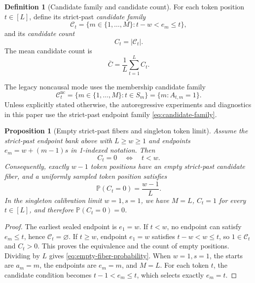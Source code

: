 \documentclass{article}
\theoremstyle{plain}
\newtheorem{proposition}[theorem]{Proposition}
\theoremstyle{definition}
\newtheorem{definition}[theorem]{Definition}
\theoremstyle{remark}
\begin{document}
\begin{definition}[Candidate family and candidate count]
\label{def:candidate-family}
For each token position $t\in [L]$, define its strict-past \emph{candidate family}
\begin{equation}
\label{eq:candidate-family}
\mathcal C_t=\{m\in\{1,\dots,M\}: t-w<e_m\le t\},
\end{equation}
and its \emph{candidate count}
\begin{equation}
\label{eq:candidate-count}
C_t=|\mathcal C_t|.
\end{equation}
The mean candidate count is
\begin{equation}
\label{eq:mean-candidate-count}
\bar C=\frac{1}{L}\sum_{t=1}^L C_t.
\end{equation}
\end{definition}

The legacy noncausal mode uses the membership candidate family
\begin{equation}
\label{eq:noncausal-candidate-family}
\mathcal C_t^{\mathrm{nc}}=\{m\in\{1,\dots,M\}:t\in S_m\}=\{m:A_{t,m}=1\}.
\end{equation}
Unless explicitly stated otherwise, the autoregressive experiments and diagnostics in this paper use the strict-past endpoint family \eqref{eq:candidate-family}.

\begin{proposition}[Empty strict-past fibers and singleton token limit]
\label{prop:legacy-empty-strict-past-fibers}
Assume the strict-past endpoint bank above with $L\ge w\ge1$ and endpoints
$e_m=w+(m-1)s$ in 1-indexed notation. Then
\[
C_t=0 \quad\Longleftrightarrow\quad t< w .
\]
Consequently, exactly $w-1$ token positions have an empty strict-past
candidate fiber, and a uniformly sampled token position satisfies
\begin{equation}
\label{eq:empty-fiber-probability}
\mathbb P(C_t=0)=\frac{w-1}{L}.
\end{equation}
In the singleton calibration limit $w=1,s=1$, we have $M=L$, $C_t=1$ for
every $t\in[L]$, and therefore $\mathbb P(C_t=0)=0$.
\end{proposition}

\begin{proof}
The earliest sealed endpoint is $e_1=w$. If $t<w$, no endpoint can satisfy
$e_m\le t$, hence $\mathcal C_t=\varnothing$. If $t\ge w$, endpoint $e_1=w$
satisfies $t-w<w\le t$, so $1\in\mathcal C_t$ and $C_t>0$. This proves the
equivalence and the count of empty positions. Dividing by $L$ gives
\eqref{eq:empty-fiber-probability}. When $w=1,s=1$, the starts are
$a_m=m$, the endpoints are $e_m=m$, and $M=L$. For each token $t$, the
candidate condition becomes $t-1<e_m\le t$, which selects exactly
$e_m=t$.
\end{proof}
\end{document}
